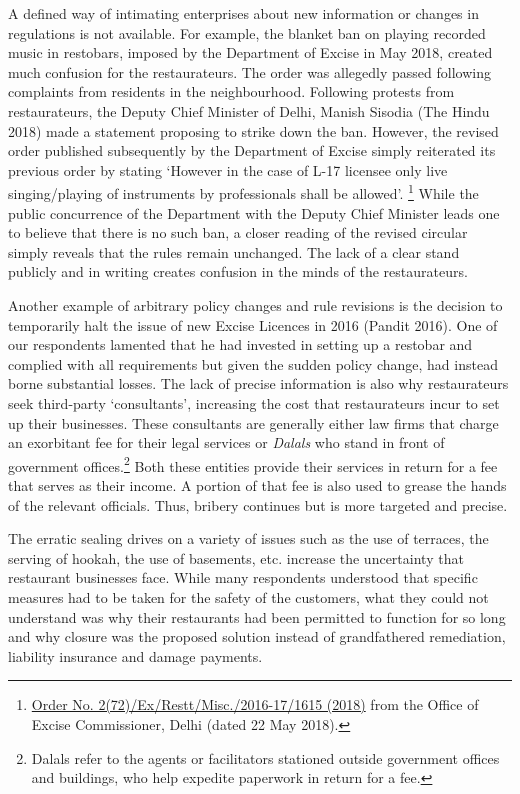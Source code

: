 \documentclass[a4paper, 12pt]{article}
\begin{document}
		A defined way of intimating enterprises about new information or changes in regulations is not available. For example, the blanket ban on playing recorded music in restobars, imposed by the Department of Excise in May 2018, created much confusion 
for the restaurateurs. The order was allegedly passed following complaints from residents in the neighbourhood. Following protests from restaurateurs, the Deputy Chief Minister of Delhi, Manish Sisodia (The Hindu 2018) made a statement proposing to strike down 
the ban. However, the revised order published subsequently by the Department of Excise simply reiterated its previous order by stating ‘However in the case of L-17 licensee only live singing/playing of instruments by professionals shall be allowed’.
\footnote{\href{https://bit.ly/2QxMK56}{Order No. 2(72)/Ex/Restt/Misc./2016-17/1615 (2018)} from the Office of Excise Commissioner, Delhi (dated 22 May 2018).}  While the public concurrence of the Department with the Deputy Chief Minister leads one to believe 
that there is no such ban, a closer reading of the revised circular simply reveals that the rules remain unchanged. The lack of a clear stand publicly and in writing creates confusion in the minds of the restaurateurs.
		
		Another example of arbitrary policy changes and rule revisions is the decision to temporarily halt the issue of new Excise Licences in 2016 (Pandit 2016). One of our respondents lamented that he had invested in setting up a restobar and complied with 
all requirements but given the sudden policy change, had instead borne substantial losses. The lack of precise information is also why restaurateurs seek third-party ‘consultants’, increasing the cost that restaurateurs incur to set up their businesses. These 
consultants are generally either law firms that charge an exorbitant fee for their legal services or \textit{Dalals} who stand in front of government offices.\footnote{Dalals refer to the agents or facilitators stationed outside government offices and buildings, who help 
expedite paperwork in return for a fee.} Both these entities provide their services in return for a fee that serves as their income. A portion of that fee is also used to grease the hands of the relevant officials. Thus, bribery continues but is more targeted and precise.
		
		The erratic sealing drives on a variety of issues such as the use of terraces, the serving of hookah, the use of basements, etc. increase the uncertainty that restaurant businesses face. While many respondents understood that specific measures had to 
be taken for the safety of the customers, what they could not understand was why their restaurants had been permitted to function for so long and why closure was the proposed solution instead of grandfathered remediation, liability insurance and damage 
payments.
\end{document}
